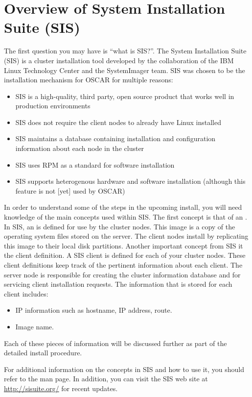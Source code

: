 %
%
%

\section{Overview of System Installation Suite (SIS)}
\label{sec:sis}

The first question you may have is ``what is SIS?''. The System
Installation Suite (SIS) is a cluster installation tool developed by
the collaboration of the IBM Linux Technology Center and the
SystemImager team.  SIS was chosen to be the installation mechanism
for OSCAR for multiple reasons:

\begin{itemize}
\item SIS is a high-quality, third party, open source product that
  works well in production environments

\item SIS does not require the client nodes to already have Linux
  installed
  
\item SIS maintains a database containing installation and
  configuration information about each node in the cluster

\item SIS uses RPM as a standard for software installation
  
\item SIS supports heterogenous hardware and software installation
  (although this feature is not [yet] used by OSCAR)
\end{itemize}

In order to understand some of the steps in the upcoming install, you
will need knowledge of the main concepts used within SIS. The first
concept is that of an . In SIS, an  is defined
for use by the cluster nodes. This image is a copy of the operating
system files stored on the server. The client nodes install by
replicating this image to their local disk partitions. Another
important concept from SIS it the client definition.  A SIS client is
defined for each of your cluster nodes.  These client definitions keep
track of the pertinent information about each client.  The server node
is responsible for creating the cluster information database and for
servicing client installation requests.  The information that is
stored for each client includes:

\begin{itemize}
\item IP information such as hostname, IP address, route.
\item Image name.
\end{itemize}

Each of these pieces of information will be discussed further as part
of the detailed install procedure.

For additional information on the concepts in SIS and how to use it,
you should refer to the  man page.  In addition, you can
visit the SIS web site at \url{http://sisuite.org/} for recent
updates.

